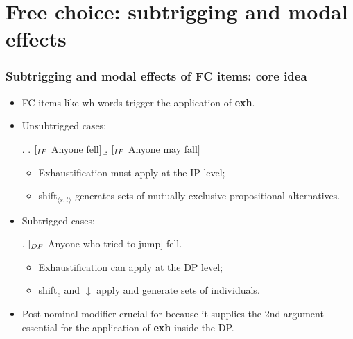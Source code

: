 \documentclass{beamer}
\newcommand\notext[1]{}
\newcommand{\bit}{\begin{itemize}}
\newcommand{\eit}{\end{itemize}}
\begin{document}
\section{Free choice: subtrigging and modal effects}
 
 \frame
 {\frametitle{Subtrigging and modal effects of FC items: core idea}




\bit
\notext{\pause} \item  FC items like wh-words trigger  the application of  {\bf exh}.
\notext{\pause} \item    {\sc Unsubtrigged  cases}:  

\vspace{-0,2cm}

{\small
\ex. \a.    $[_{\sc IP}$ Anyone fell$]$  
\b. $[_{\sc IP}$ Anyone may fall$]$

}

\vspace{-0,2cm}
\bit
\item  Exhaustification must apply at the {\sc IP} level;
 \item    {\sc shift}$_{\langle s,t\rangle }$   generates sets of   mutually exclusive propositional alternatives.
 
\eit
\notext{\pause} \item {\sc Subtrigged cases}:   

\vspace{-0,2cm}

{\small \ex. $[_{\sc DP}$ Anyone who tried to jump$]$ fell.

}

\vspace{-0,2cm}

\bit  


\item Exhaustification can apply at the {\sc DP} level;
\item {\sc shift}$_{e}$ and $\downarrow$ apply and   generate  sets of individuals.
  \eit

\notext{\pause} \item Post-nominal modifier       crucial for \Last  because it supplies      the 2nd argument   essential for the application of  {\bf exh}  inside the {\sc DP}.   
\eit


}

 
\end{document}
